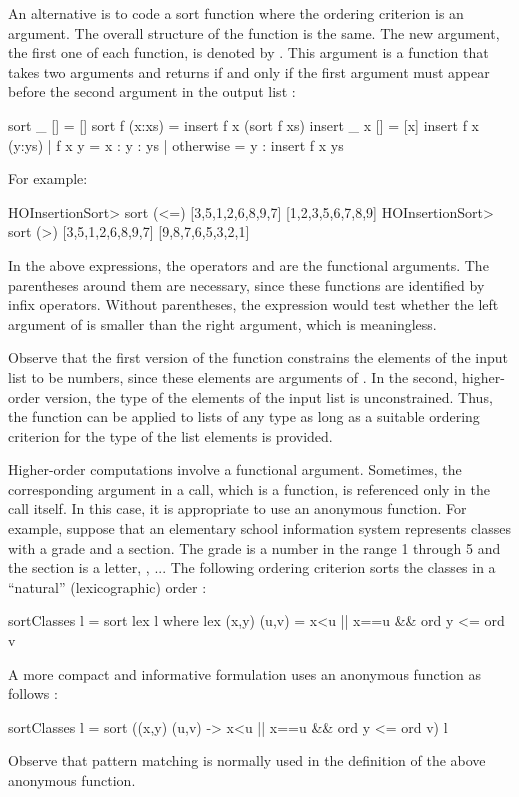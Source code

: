 An alternative is to code a sort function where the ordering
criterion is an argument.
The overall structure of the function is the same.
The new argument, the first one of each function,
is denoted by .
This argument is a function that takes two arguments
and returns  if and only if the first argument
must appear before the second argument in the output list
:
%
\begin{prog}
\label{HOInsertionSort}
sort _ []     = []
sort f (x:xs) = insert f x (sort f xs)
\medskip
insert _ x [] = [x]
insert f x (y:ys) | f x y     = x : y : ys
                  | otherwise = y : insert f x ys
\end{prog}
%
For example:
%
\begin{prog}
HOInsertionSort> sort (<=) [3,5,1,2,6,8,9,7]
[1,2,3,5,6,7,8,9]
HOInsertionSort> sort (>) [3,5,1,2,6,8,9,7]
[9,8,7,6,5,3,2,1]
\end{prog}
%
In the above expressions, 
the operators \ccode{<=} and \ccode{>} are the functional arguments.
The parentheses around them are necessary, since these
functions are identified by infix operators.
Without parentheses, the expression 
would test whether the left argument of \ccode{<=}
is smaller than the right argument, which is meaningless.

Observe that the first version of the  function constrains
the elements of the input list to be numbers,
since these elements are arguments of \ccode{<=}.
In the second, higher-order version, the type 
of the elements of the input list is unconstrained.
Thus, the function can be applied to lists of any type
as long as a suitable ordering criterion
for the type of the list elements is provided.

Higher-order computations involve a functional argument.
Sometimes, the corresponding argument in a call, which is
a function, is referenced only in the call itself.
In this case, it is appropriate to use an anonymous
function.
For example, suppose that an elementary school information
system represents classes with a grade and a section.
The grade is a number in the range 1 through 5 and the
section is a letter, ,  ...
The following ordering criterion sorts the classes
in a  ``natural'' (lexicographic) order
:
%
\begin{prog}
sortClasses l = sort lex l
   where lex (x,y) (u,v) = x<u || x==u \&\& ord y <= ord v 
\end{prog}
%
A more compact and informative formulation uses
an anonymous function as follows
:
%
\begin{prog}
sortClasses l = sort ((x,y) (u,v) -> x<u || x==u \&\& ord y <= ord v) l
\end{prog}
%
Observe that pattern matching is normally used in the definition
of the above anonymous function.

